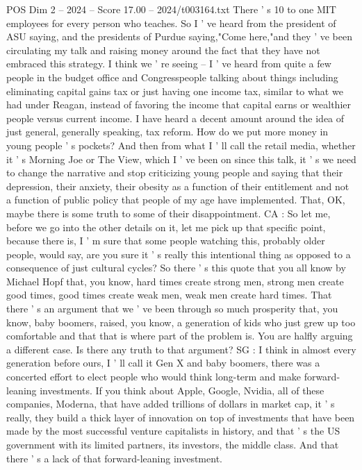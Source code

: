\begin{textsample}{POS Dim 2 – 2024 – Score 17.00 – 2024/t003164.txt}
There ' s 10 to one MIT employees for every person who teaches.
So I ' ve heard from the president of ASU saying, and the presidents of Purdue saying,"Come here,"and they ' ve been circulating my talk and raising money around the fact that they have not embraced this strategy.
I think we ' re seeing -- I ' ve heard from quite a few people in the budget office and Congresspeople talking about things including eliminating capital gains tax or just having one income tax, similar to what we had under Reagan, instead of favoring the income that capital earns or wealthier people versus current income.
I have heard a decent amount around the idea of just general, generally speaking, tax reform.
How do we put more money in young people ' s pockets?
And then from what I ' ll call the retail media, whether it ' s Morning Joe or The View, which I ' ve been on since this talk, it ' s we need to change the narrative and stop criticizing young people and saying that their depression, their anxiety, their obesity as a function of their entitlement and not a function of public policy that people of my age have implemented.
That, OK, maybe there is some truth to some of their disappointment.
CA : So let me, before we go into the other details on it, let me pick up that specific point, because there is, I ' m sure that some people watching this, probably older people, would say, are you sure it ' s really this intentional thing as opposed to a consequence of just cultural cycles?
So there ' s this quote that you all know by Michael Hopf that, you know, hard times create strong men, strong men create good times, good times create weak men, weak men create hard times.
That there ' s an argument that we ' ve been through so much prosperity that, you know, baby boomers, raised, you know, a generation of kids who just grew up too comfortable and that that is where part of the problem is.
You are halfly arguing a different case.
Is there any truth to that argument?
SG : I think in almost every generation before ours, I ' ll call it Gen X and baby boomers, there was a concerted effort to elect people who would think long-term and make forward-leaning investments.
If you think about Apple, Google, Nvidia, all of these companies, Moderna, that have added trillions of dollars in market cap, it ' s really, they build a thick layer of innovation on top of investments that have been made by the most successful venture capitalists in history, and that ' s the US government with its limited partners, its investors, the middle class.
And that there ' s a lack of that forward-leaning investment.

\end{textsample}
